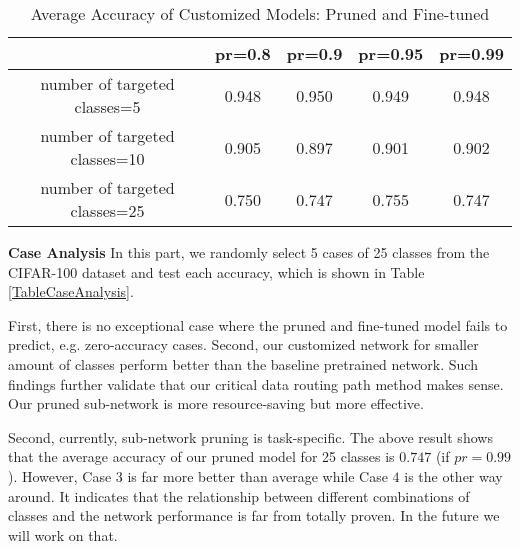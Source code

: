 \documentclass[conference]{IEEEtran}
\begin{document}
\begin{table}[htb!]
	\centering
	\caption{Average Accuracy of Customized Models: Pruned and Fine-tuned}
	\label{tab:table2}
    \begin{tabular}{|c|c|c|c|c|}
    	\hline
    	& pr=0.8 & pr=0.9 & pr=0.95 & pr=0.99\\ \hline
    	number of targeted classes=5  & 0.948 & 0.950 & 0.949 & 0.948\\ \hline
    	number of targeted classes=10  & 0.905 & 0.897 & 0.901 & 0.902\\ \hline
    	number of targeted classes=25  & 0.750 & 0.747 & 0.755 & 0.747\\ \hline
    \end{tabular}
\end{table}


\textbf{Case Analysis} \; In this part, we randomly select 5 cases of 25 classes from the CIFAR-100 dataset and test each accuracy, which is shown in Table \ref{TableCaseAnalysis}. 

First, there is no exceptional case where the pruned and fine-tuned model fails to predict, e.g. zero-accuracy cases. Second, our customized network for smaller amount of classes perform better than the baseline pretrained network. Such findings further validate that our critical data routing path method makes sense. Our pruned sub-network is more resource-saving but more effective.

Second, currently, sub-network pruning is task-specific. The above result shows that the average accuracy of our pruned model for 25 classes is $0.747$ (if $pr=0.99$). However, Case $3$ is far more better than average while Case $4$ is the other way around. It indicates that the relationship between different combinations of classes and the network performance is far from totally proven. In the future we will work on that.
\end{document}
